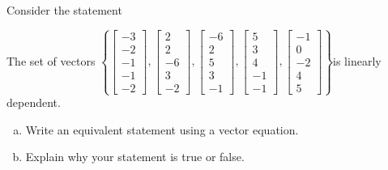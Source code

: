 
\begin{exerciseStatement}


Consider the statement 
\begin{center}\begin{minipage}{0.8\textwidth}
 The set of vectors \( \left\{ \left[\begin{array}{c}
-3 \\
-2 \\
-1 \\
-1 \\
-2
\end{array}\right] , \left[\begin{array}{c}
2 \\
2 \\
-6 \\
3 \\
-2
\end{array}\right] , \left[\begin{array}{c}
-6 \\
2 \\
5 \\
3 \\
-1
\end{array}\right] , \left[\begin{array}{c}
5 \\
3 \\
4 \\
-1 \\
-1
\end{array}\right] , \left[\begin{array}{c}
-1 \\
0 \\
-2 \\
4 \\
5
\end{array}\right] \right\} \)is linearly dependent.
\end{minipage}\end{center}
    


\begin{enumerate}[(a)]
\item  Write an equivalent statement using a vector equation.
\item  Explain why your statement is true or false.
\end{enumerate}
    
\end{exerciseStatement}
    
